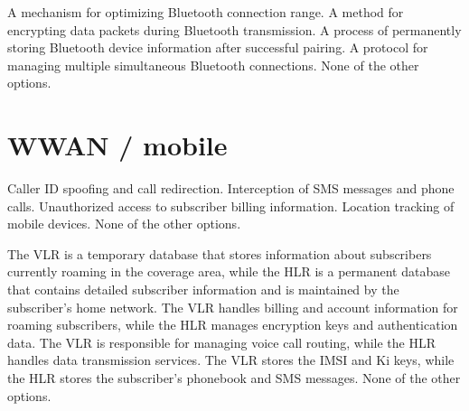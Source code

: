 \begin{questions}
    \begin{checkboxes}
        \choice A mechanism for optimizing Bluetooth connection range.
        \choice A method for encrypting data packets during Bluetooth transmission.
        \CorrectChoice A process of permanently storing Bluetooth device information after successful pairing.
        \choice A protocol for managing multiple simultaneous Bluetooth connections.
        \choice None of the other options.
    \end{checkboxes}

    \section{WWAN / mobile}



    \begin{checkboxes}
        \CorrectChoice Caller ID spoofing and call redirection.
        \CorrectChoice Interception of SMS messages and phone calls.
        \choice Unauthorized access to subscriber billing information.
        \choice Location tracking of mobile devices.
        \choice None of the other options.
    \end{checkboxes}


    \begin{checkboxes}
        \CorrectChoice The VLR is a temporary database that stores information about subscribers currently roaming in the coverage area, while the HLR is a permanent database that contains detailed subscriber information and is maintained by the subscriber's home network.
        \choice The VLR handles billing and account information for roaming subscribers, while the HLR manages encryption keys and authentication data.
        \choice The VLR is responsible for managing voice call routing, while the HLR handles data transmission services.
        \choice The VLR stores the IMSI and Ki keys, while the HLR stores the subscriber's phonebook and SMS messages.
        \choice None of the other options.
    \end{checkboxes}



\end{questions}
